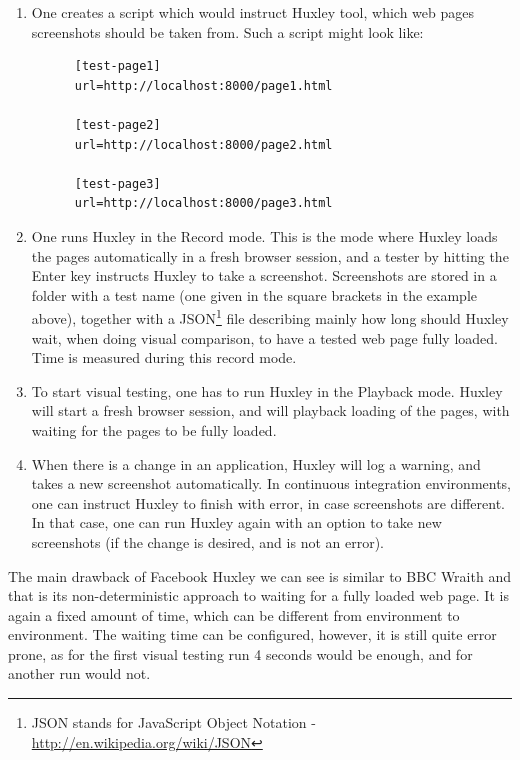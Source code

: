 \documentclass[11pt,oneside,final]{fithesis2}
\begin{document}
  \begin{enumerate}
   \item One creates a script which would instruct Huxley tool, which web pages screenshots should be taken from. Such a script might look like:
  
    \begin{verbatim}
      [test-page1]
      url=http://localhost:8000/page1.html

      [test-page2]
      url=http://localhost:8000/page2.html
   
      [test-page3]
      url=http://localhost:8000/page3.html
    \end{verbatim}
    
    \item One runs Huxley in the Record mode. This is the mode where Huxley loads the pages automatically in a fresh browser session, and a tester by hitting the Enter key instructs 
    Huxley to take a screenshot. Screenshots are stored in a folder with a test name (one given in the square brackets in the example above), together with a 
    JSON\footnote{JSON stands for JavaScript Object Notation - \url{http://en.wikipedia.org/wiki/JSON}} file describing mainly how long should 
    Huxley wait, when doing visual comparison, to have a tested web page fully loaded. Time is measured during this record mode.
    
    \item To start visual testing, one has to run Huxley in the Playback mode. Huxley will start a fresh browser session, and will playback loading of the pages, with waiting for the pages
    to be fully loaded.
    
    \item When there is a change in an application, Huxley will log a warning, and takes a new screenshot automatically. In continuous integration environments, one can instruct Huxley
    to finish with error, in case screenshots are different. In that case, one can run Huxley again with an option to take new screenshots (if the change is desired, and is not an error).
   \end{enumerate}
    
   The main drawback of Facebook Huxley we can see is similar to BBC Wraith and that is its non-deterministic approach to waiting for a fully loaded web page. It is again a fixed amount of time,
   which can be different from environment to environment. The waiting time can be configured, however, it is still quite error prone, as for the first visual testing run
   4 seconds would be enough, and for another run would not.
    
\end{document}
